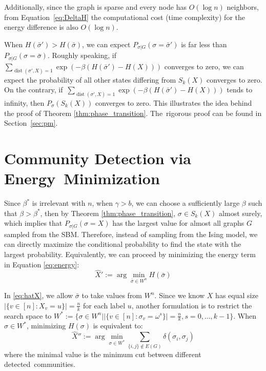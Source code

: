 \documentclass[entropy,article,accept,moreauthors,pdftex]{Definitions/mdpi}
\newcommand{\1}{\mathbbm{1}}
\DeclareMathOperator{\Dist}{dist}
\begin{document}
\begin{paracol}{2}
Additionally, since the graph is sparse and every node has $O(\log n)$ neighbors, from Equation~\eqref{eq:DeltaH} the computational cost (time complexity) for the energy difference
is also $O(\log n)$. 

When $H(\bar{\sigma}') > H(\bar{\sigma})$, we can expect $P_{\sigma | G}(\sigma = \bar{\sigma}')$ is far less than 
$P_{\sigma | G}(\sigma = \bar{\sigma})$.
Roughly speaking, if~ $ \sum_{\Dist(\sigma', X)=1}\exp(-\beta(H(\bar{\sigma}') - H(X))) $ converges to zero,
we can expect the probability of all other states differing from $S_k(X)$ converges to zero.
On the contrary, if~$ \sum_{\Dist(\sigma', X)=1}\exp(-\beta(H(\bar{\sigma}') - H(X))) $ tends to infinity,
then  $P_{\sigma}(S_k(X))$ converges to zero. This illustrates the idea behind
the proof of
Theorem \ref{thm:phase_transition}. The~rigorous proof can be found in Section~\ref{sec:pm}.


\section{Community Detection via Energy~Minimization}\label{sec:em}
Since $\beta^*$ is irrelevant with $n$, when $\gamma>b$, we can choose a sufficiently large $\beta$ such that
$\beta > \beta^*$, then by Theorem \ref{thm:phase_transition}, $\sigma \in S_k(X)$ almost surely, which
implies that $P_{\sigma | G}(\sigma = X)$ has the largest value for almost all graphs $G$ sampled from the SBM. Therefore, instead of
sampling from the Ising model, we can directly maximize the conditional probability to find the state with the largest probability.
Equivalently, we can proceed by minimizing the energy term in Equation \eqref{eq:energy}:
\begin{equation}\label{eq:hatX}
\hat{X}' := \arg\min_{\bar{\sigma} \in W^n} H(\bar{\sigma})
\end{equation}

In \eqref{eq:hatX}, we allow $\bar{\sigma}$ to take values from $W^n$. Since we know $X$ has equal
size\linebreak $|\{v \in [n] : X_v = u\}| = \frac{n}{k}$ for each label $u$, another formulation is to restrict the search space to
$W^*:= \{\sigma\in W^n \big\vert |\{v \in [n] : \sigma_v = \omega^s\}| = \frac{n}{k}, s=0,\dots, k-1 \}$.
When $\sigma \in W^*$, minimizing $H(\sigma)$ is equivalent to:
\begin{equation}
\hat{X}'' := \arg\min_{\sigma \in W^*} \sum_{\{i,j\} \not\in E(G) } \delta(\sigma_i, \sigma_j)
\end{equation}
where the minimal value is the minimum cut between different detected~communities.


\end{paracol}
\end{document}
